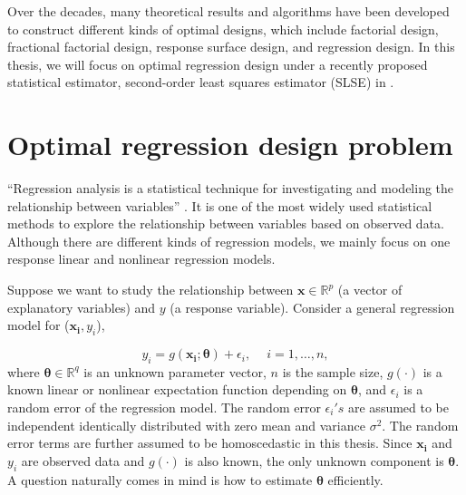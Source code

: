 \documentclass[
]{book}
\theoremstyle{definition}
\theoremstyle{definition}
\theoremstyle{definition}
\theoremstyle{definition}
\theoremstyle{remark}
\begin{document}
Over the decades, many theoretical results and algorithms have been developed to construct different kinds of optimal designs, which include factorial design, fractional factorial design, response surface design, and regression design. In this thesis, we will focus on optimal regression design under a recently proposed statistical estimator, second-order least squares estimator (SLSE) in \citet{wang2008second}.

\section{Optimal regression design problem}\label{optimal-regression-design-problem}

``Regression analysis is a statistical technique for investigating and modeling the relationship between variables'' \citep{montgomery2012introduction}. It is one of the most widely used statistical methods to explore the relationship between variables based on observed data. Although there are different kinds of regression models, we mainly focus on one response linear and nonlinear regression models.

Suppose we want to study the relationship between \(\boldsymbol{x}\in \mathbb{R}^p\) (a vector of explanatory variables) and \(y\) (a response variable). Consider a general regression model for (\(\boldsymbol{x_i},y_i\)),

\begin{equation}
y_i=g\left(\boldsymbol{x_i};\boldsymbol{\theta}\right)+\epsilon_i,\quad ~i=1,\dots,n,
\label{eq:simple-regression}
\end{equation}
where \(\boldsymbol{\theta}\in \mathbb{R}^q\) is an unknown parameter vector, \(n\) is the sample size, \(g(\cdot)\) is a known linear or nonlinear expectation function depending on \(\boldsymbol{\theta}\), and \(\epsilon_i\) is a random error of the regression model. The random error \(\epsilon_i's\) are assumed to be independent identically distributed with zero mean and variance \(\sigma^2\). The random error terms are further assumed to be homoscedastic in this thesis. Since \(\boldsymbol{x_i}\) and \(y_i\) are observed data and \(g(\cdot)\) is also known, the only unknown component is \(\boldsymbol{\theta}\). A question naturally comes in mind is how to estimate \(\boldsymbol{\theta}\) efficiently.
\end{document}

